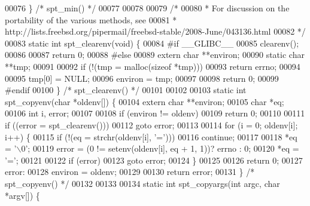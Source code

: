 \begin{DoxyCode}
00076 \} \textcolor{comment}{/* spt\_min() */}
00077 
00078 
00079 \textcolor{comment}{/*}
00080 \textcolor{comment}{ * For discussion on the portability of the various methods, see}
00081 \textcolor{comment}{ * http://lists.freebsd.org/pipermail/freebsd-stable/2008-June/043136.html}
00082 \textcolor{comment}{ */}
00083 \textcolor{keyword}{static} \textcolor{keywordtype}{int} spt\_clearenv(\textcolor{keywordtype}{void}) \{
00084 \textcolor{preprocessor}{#}\textcolor{preprocessor}{if} \_\_GLIBC\_\_
00085     clearenv();
00086 
00087     \textcolor{keywordflow}{return} 0;
00088 \textcolor{preprocessor}{#}\textcolor{preprocessor}{else}
00089     \textcolor{keyword}{extern} \textcolor{keywordtype}{char} **environ;
00090     \textcolor{keyword}{static} \textcolor{keywordtype}{char} **tmp;
00091 
00092     \textcolor{keywordflow}{if} (!(tmp = malloc(\textcolor{keyword}{sizeof} *tmp)))
00093         \textcolor{keywordflow}{return} errno;
00094 
00095     tmp[0]  = NULL;
00096     environ = tmp;
00097 
00098     \textcolor{keywordflow}{return} 0;
00099 \textcolor{preprocessor}{#}\textcolor{preprocessor}{endif}
00100 \} \textcolor{comment}{/* spt\_clearenv() */}
00101 
00102 
00103 \textcolor{keyword}{static} \textcolor{keywordtype}{int} spt\_copyenv(\textcolor{keywordtype}{char} *oldenv[]) \{
00104     \textcolor{keyword}{extern} \textcolor{keywordtype}{char} **environ;
00105     \textcolor{keywordtype}{char} *eq;
00106     \textcolor{keywordtype}{int} i, error;
00107 
00108     \textcolor{keywordflow}{if} (environ != oldenv)
00109         \textcolor{keywordflow}{return} 0;
00110 
00111     \textcolor{keywordflow}{if} ((error = spt\_clearenv()))
00112         \textcolor{keywordflow}{goto} error;
00113 
00114     \textcolor{keywordflow}{for} (i = 0; oldenv[i]; i++) \{
00115         \textcolor{keywordflow}{if} (!(eq = strchr(oldenv[i], \textcolor{stringliteral}{'='})))
00116             \textcolor{keywordflow}{continue};
00117 
00118         *eq = \textcolor{stringliteral}{'\(\backslash\)0'};
00119         error = (0 != setenv(oldenv[i], eq + 1, 1))? errno : 0;
00120         *eq = \textcolor{stringliteral}{'='};
00121 
00122         \textcolor{keywordflow}{if} (error)
00123             \textcolor{keywordflow}{goto} error;
00124     \}
00125 
00126     \textcolor{keywordflow}{return} 0;
00127 error:
00128     environ = oldenv;
00129 
00130     \textcolor{keywordflow}{return} error;
00131 \} \textcolor{comment}{/* spt\_copyenv() */}
00132 
00133 
00134 \textcolor{keyword}{static} \textcolor{keywordtype}{int} spt\_copyargs(\textcolor{keywordtype}{int} argc, \textcolor{keywordtype}{char} *argv[]) \{

\end{DoxyCode}
